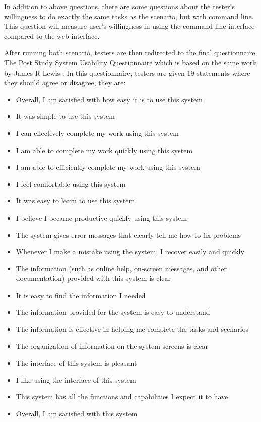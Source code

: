 In addition to above questions, there are some questions about the tester's willingness to do exactly the same tasks as the scenario, but with command line. This question will measure user's willingness in using the command line interface compared to the web interface. 


After running both scenario, testers are then redirected to the final questionnaire. The Post Study System Usability Questionnaire which is based on the same work by James R Lewis \citep{lewis1995ibm}. In this questionnaire, testers are given 19 statements where they should agree or disagree, they are:
\begin{itemize}
	\item Overall, I am satisfied with how easy it is to use this system
	\item It was simple to use this system
	\item I can effectively complete my work using this system 
	\item I am able to complete my work quickly using this system
	\item I am able to efficiently complete my work using this system
	\item I feel comfortable using this system
	\item It was easy to learn to use this system
	\item I believe I became productive quickly using this system
	\item The system gives error messages that clearly tell me how to fix problems
	\item Whenever I make a mistake using the system, I recover easily and quickly
	\item The information (such as online help, on-screen messages, and other documentation) provided with this system is clear
	\item It is easy to find the information I needed
	\item The information provided for the system is easy to understand
	\item The information is effective in helping me complete the tasks and scenarios 
	\item The organization of information on the system screens is clear
	\item The interface of this system is pleasant
	\item I like using the interface of this system
	\item This system has all the functions and capabilities I expect it to have 
	\item Overall, I am satisfied with this system
\end{itemize}

